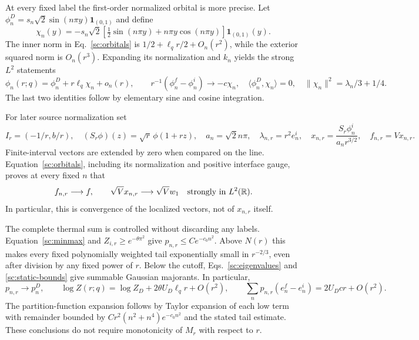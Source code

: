 \documentclass[aps,prl,reprint,superscriptaddress,longbibliography]{revtex4-2}
\begin{document}
At every fixed label the first-order normalized orbital is more precise.
Let $\phi_n^D=s_n\sqrt2\sin(n\pi y)\mathbf1_{(0,1)}$ and define
\begin{equation}
 \chi_n(y)=-s_n\sqrt2
 \left[\tfrac12\sin(n\pi y)+n\pi y\cos(n\pi y)\right]
 \mathbf1_{(0,1)}(y).
 \label{sc:tangent}
\end{equation}
The inner norm in Eq.~\eqref{sc:orbitals} is
$1/2+\ell_qr/2+O_n(r^2)$, while the exterior squared norm is $O_n(r^3)$.
Expanding its normalization and $k_n$ yields the strong $L^2$ statements
\begin{equation}
 \phi_n(r;q)=\phi_n^D+r\ell_q\chi_n+o_n(r),\qquad
 r^{-1}(\phi_n^f-\phi_n^i)\longrightarrow-c\chi_n,
 \quad
 \langle\phi_n^D,\chi_n\rangle=0,\quad
 \|\chi_n\|^2=\lambda_n/3+1/4.
 \label{sc:tangent-limit}
\end{equation}
The last two identities follow by elementary sine and cosine integration.

For later source normalization set
\begin{equation}
 I_r=(-1/r,b/r),\quad
 (S_r\phi)(z)=\sqrt r\,\phi(1+rz),\quad
 a_n=\sqrt2n\pi,\quad
 \lambda_{n,r}=r^2e_n^i,\quad
 x_{n,r}=\frac{S_r\phi_n^i}{a_nr^{3/2}},\quad
 f_{n,r}=Vx_{n,r}.
 \label{sc:scaling}
\end{equation}
Finite-interval vectors are extended by zero when compared on the line.
Equation~\eqref{sc:orbitals}, including its normalization and positive
interface gauge, proves at every fixed $n$ that
\begin{equation}
 f_{n,r}\longrightarrow f,\qquad
 \sqrt Vx_{n,r}\longrightarrow\sqrt Vw_1
 \quad\hbox{strongly in }L^2(\mathbb R).
 \label{sc:static-source-limit}
\end{equation}
In particular, this is convergence of the localized vectors, not of
$x_{n,r}$ itself.

The complete thermal sum is controlled without discarding any labels.
Equation~\eqref{sc:minmax} and $Z_{i,r}\ge e^{-\theta\pi^2}$ give
$p_{n,r}\le C e^{-c_0 n^2}$. Above $N(r)$ this makes every fixed
polynomially weighted tail exponentially small in $r^{-2/3}$, even
after division by any fixed power of $r$. Below the cutoff,
Eqs.~\eqref{sc:eigenvalues} and \eqref{sc:static-bounds} give summable
Gaussian majorants. In particular,
\begin{equation}
 p_{n,r}\longrightarrow p_n^D,\qquad
 \log Z(r;q)=\log Z_D+2\theta U_D\ell_qr+O(r^2),\qquad
 \sum_n p_{n,r}(e_n^f-e_n^i)=2U_Dcr+O(r^2).
 \label{sc:thermal-endpoints}
\end{equation}
The partition-function expansion follows by Taylor expansion of each
low term with remainder bounded by $Cr^2(n^2+n^4)e^{-c_0n^2}$ and
the stated tail estimate. These conclusions do not require monotonicity
of $M_r$ with respect to $r$.
\end{document}
